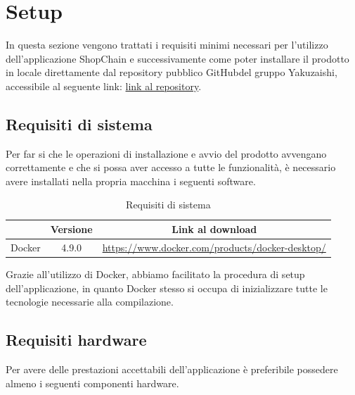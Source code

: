 \section{Setup}\label{section:setup}

In questa sezione vengono trattati i requisiti minimi necessari per l’utilizzo dell’applicazione ShopChain e successivamente come poter installare il prodotto in locale direttamente dal repository\glo
pubblico GitHub\glo del gruppo Yakuzaishi, accessibile al seguente link: \href{https://yakuzaishi-swe.github.io}{link al repository}.

\subsection{Requisiti di sistema}

Per far si che le operazioni di installazione e avvio del prodotto avvengano correttamente e che si possa
aver accesso a tutte le funzionalità, è necessario avere installati nella propria macchina i seguenti software.

\begin{table}[H]
	\centering
	\renewcommand{\arraystretch}{1.8}
    \begin{tabular}{c | c | c}
		\rowcolor[HTML]{125E28}
		\multicolumn{1}{c}{\color[HTML]{FFFFFF} \textbf{Software}} &
        \multicolumn{1}{c}{\color[HTML]{FFFFFF} \textbf{Versione}} & 
		\multicolumn{1}{c}{\color[HTML]{FFFFFF} \textbf{Link al download}}   \\ \hline
        Docker & 4.9.0 & \href{https://www.docker.com/products/docker-desktop/}{https://www.docker.com/products/docker-desktop/} \\ \hline
    \end{tabular}
    \caption{Requisiti di sistema}
\end{table}

Grazie all'utilizzo di Docker\glo, abbiamo facilitato la procedura di setup dell'applicazione, in quanto Docker stesso si occupa di inizializzare tutte le tecnologie necessarie alla compilazione.

\subsection{Requisiti hardware}

Per avere delle prestazioni accettabili dell’applicazione è preferibile possedere almeno i seguenti componenti hardware.

